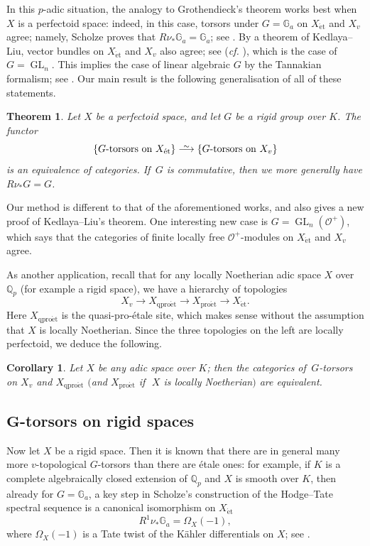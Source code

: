 \documentclass[11pt]{amsart}
\numberwithin{equation}{section}
\newtheorem{Theorem}[thm]{Theorem}
\newtheorem{Corollary}[thm]{Corollary}
\theoremstyle{definition}
\theoremstyle{remark}
\newcommand{\lra}{\longrightarrow}
\newcommand*{\lowsim}{\vbox to 0pt{\vss\hbox{$\scriptstyle\sim$}\vskip-2pt}}
\newcommand*{\longisomarrow}{\stackrel{\lowsim}{\lra}}
\newcommand{\G}{\mathbb{G}}
\renewcommand{\O}{\mathcal{O}}
\newcommand{\Q}{\mathbb{Q}}
\newcommand{\GL}{\operatorname{GL}}
\newcommand{\et}{{\operatorname{\acute{e}t}}}
\newcommand{\proet}{{\operatorname{pro\acute{e}t}}}
\newcommand{\qproet}{{\operatorname{qpro\acute{e}t}}}
\begin{document}
	\medskip
	
	In this $p$-adic situation, the  analogy to Grothendieck's theorem works best when $X$ is a perfectoid space: indeed,
        in this case, torsors under $G=\G_a$ on $X_{\et}$ and $X_{v}$ agree; namely, Scholze proves that  $R\nu_{\ast}\G_a=\G_a$; see \cite[Proposition 8.8]{etale-cohomology-of-diamonds}.
	By a theorem of Kedlaya--Liu,  vector bundles on $X_{\et}$ and $X_v$ also agree; see \cite[Theorem~3.5.8]{KedlayaLiu-II} (\textit{cf.}
        \cite[Lemma 17.1.8]{ScholzeBerkeleyLectureNotes}), which is the case of $G=\GL_n$. This implies the case of linear algebraic $G$ by the Tannakian formalism; see \cite[Section~19.5]{ScholzeBerkeleyLectureNotes}.
	Our main result is the following generalisation of all of these statements.
	
	\begin{Theorem}\label{t:G-torsors-on-perfectoid-spaces}
		Let $X$ be a perfectoid space, and let $G$ be a rigid group over $K$. The functor
			\[ \left\{ \text{$G$-torsors on $X_{\et}$}\right\}\longisomarrow \left\{\text{$G$-torsors on $X_{v}$}\right\}\]
			is an equivalence of categories. If\, $G$ is commutative, then we more generally have $R\nu_{\ast}G=G$.
	\end{Theorem}
        
	Our method is different to that of the aforementioned works, and also gives a new proof of Kedlaya--Liu's theorem.
	One interesting new case is $G=\GL_n(\O^+)$, which says that the categories of finite locally free $\O^+$-modules on $X_{\et}$ and $X_v$ agree. 
	
	As another application, recall that for any locally Noetherian adic space $X$ over $\Q_p$ (for example a rigid space), we have a hierarchy of topologies
	\[ X_v\lra X_\qproet\lra X_{\proet}\lra X_\et.\]
	Here $X_\qproet$ is the quasi-pro-\'etale site, which makes sense without the assumption that $X$ is locally Noetherian.
	Since the three topologies on the left are locally perfectoid, we deduce the following. 
	
	
	\begin{Corollary}
		Let $X$ be any adic space over $K$; then the categories of\, $G$-torsors on $X_{v}$ and  $X_{\qproet}$ $($and $X_\proet$ if\,~$X$ is locally Noetherian$)$ are equivalent. 
	\end{Corollary}
	
\subsection{$\boldsymbol{G}$-torsors on rigid spaces}
Now let $X$ be a rigid space. Then it is known that there are in general many more \mbox{$v$-topological} $G$-torsors than there are \'etale ones: for example, if $K$ is a complete algebraically closed extension of $\Q_p$ and $X$ is smooth over $K$, then already for $G=\G_a$, a key step in Scholze's construction of the Hodge--Tate spectral sequence is a canonical isomorphism on $X_\et$
\[R^1\nu_{\ast}\G_a=\Omega_X(-1), \]
where $\Omega_X(-1)$ is a Tate twist of the K\"ahler differentials on $X$; see  
\cite[Proposition~3.23]{Scholze2012Survey}.
\end{document}

